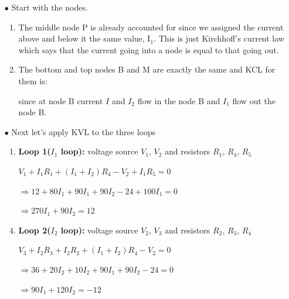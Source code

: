 \documentclass[a4 paper]{article}
\numberwithin{equation}{section}
\newcommand{\0}{\mathbf{0}}
\begin{document}
\begin{itemize} \itemsep2pt \parskip0pt 
  \item[$\bullet$] Start with the nodes.
  \begin{enumerate} \itemsep2pt \parskip0pt 
  \item The middle node P is already accounted for since we assigned the current above and below it the same value, I$_1$.  This is just Kirchhoff’s current law which says that the current going into a node is equal to that going out. 
  \item The bottom and top nodes B and M are exactly the same and KCL for them is:
  \item[] \hspace{6 cm}{$I - I_1 + I_2 = 0$}\newline
  since at node B current $I$ and $I_2$ flow in the node B and $I_1$ flow out the node B.
  \end{enumerate}
  \item[$\bullet$] Next let's apply KVL to the three loops
  \begin{enumerate} \itemsep1pt \parskip0pt 
    \item {\bf Loop 1($I_1$ loop):} voltage source $V_1$, $V_2$ and resistors $R_1$, $R_4$, $R_5$ \newline\newline
    \centerline{$V_1 + I_1R_1 + (I_1+I_2)R_4 - V_2 + I_1R_5 = 0$}\newline
    \item[] \hspace{56 mm}$\Rightarrow 12 + 80I_1 + 90I_1 + 90I_2 - 24 + 100I_1 = 0$
    \newline
    \item[] \hspace{56 mm}$\Rightarrow 270I_1 + 90I_2 = 12$
    \newline

    \item {\bf Loop 2($I_2$ loop):} voltage source $V_2$, $V_3$ and resistors $R_2$, $R_3$, $R_4$ \newline\newline
    \centerline{$V_3 + I_2R_3 + I_2R_2 + (I_1 + I_2)R_4 -V_2 = 0$}
    \newline
    \item[] \hspace{56 mm}$\Rightarrow 36 + 20I_2 + 10I_2 + 90I_1 + 90I_2- 24 = 0$ \newline
    \item[] \hspace{56 mm}$\Rightarrow 90I_1 + 120I_2 = -12$
    \newline
  

\end{enumerate}
\end{itemize}
\end{document}
